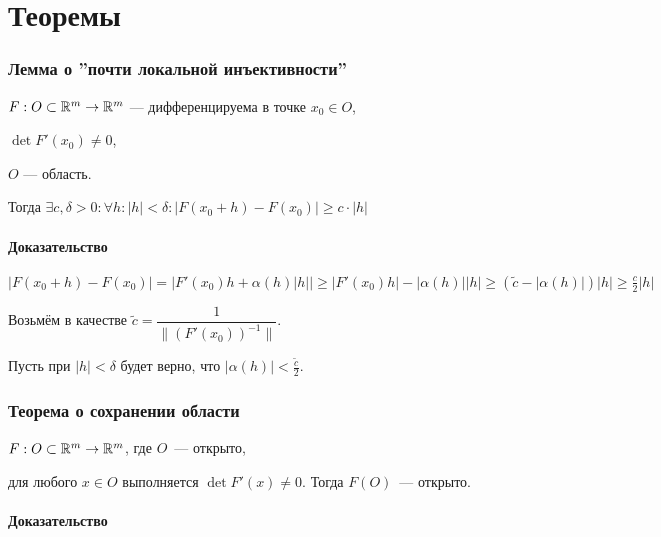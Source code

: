 \documentclass{article}
\begin{document}
\newpage

\part{Теоремы}

    \newpage
    
    \section{Лемма о ''почти локальной инъективности''}
    
        $F : O \subset \mathbb{R}^m \rightarrow \mathbb{R}^m$ --- дифференцируема в точке $x_0 \in O$, 
        
        $\det F'(x_0) \neq 0$,
        
        $O$ --- область.
        
        Тогда $\exists c, \delta > 0 : \forall h : \left| h \right| < \delta : \left| F(x_0 + h) - F(x_0) \right| \geq c \cdot \left| h \right|$
        
        \subsection{Доказательство}
        
            $\left| F(x_0 + h) - F(x_0) \right| = \left| F'(x_0)h + \alpha(h) \left| h \right| \right| \geq \left| F'(x_0) h \right| - \left| \alpha(h) \right| \left| h \right| \geq (\widetilde{c} - \left| \alpha(h) \right|) \left| h \right| \geq \frac{c}{2} \left| h \right|$
        
            Возьмём в качестве $\widetilde{c} = \dfrac{1}{\| (F'(x_0))^{-1} \|}$.
        
            Пусть при $|h| < \delta$ будет верно, что $\left| \alpha(h) \right| < \frac{\widetilde{c}}{2}$.
        
    \newpage
    
    \section{Теорема о сохранении области}
    
        $F : O \subset \mathbb{R}^m \rightarrow \mathbb{R}^m$, где $O$~--- открыто,
        
        для любого $x \in O$ выполняется $\det F'(x) \neq 0$. Тогда $F(O)$~--- открыто.
        
        \subsection{Доказательство}
        
\end{document}
